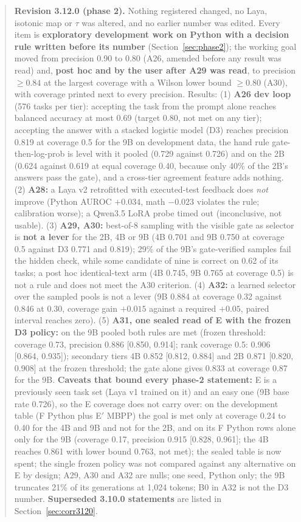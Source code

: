 \documentclass[11pt,a4paper]{article}
\begin{document}
\begin{abstract}
\textbf{Revision 3.12.0 (phase 2).} Nothing registered changed, no Laya, isotonic map or $\tau$ was altered, and no earlier number was edited. Every item is \textbf{exploratory development work on Python with a decision rule written before its number} (Section~\ref{sec:phase2}); the working goal moved from precision 0.90 to 0.80 (A26, amended before any result was read) and, \textbf{post hoc and by the user after A29 was read}, to precision $\ge0.84$ at the largest coverage with a Wilson lower bound $\ge0.80$ (A30), with coverage printed next to every precision. Results: (1) \textbf{A26 dev loop} (576 tasks per tier): accepting the task from the prompt alone reaches balanced accuracy at most 0.69 (target 0.80, not met on any tier); accepting the answer with a stacked logistic model (D3) reaches precision 0.819 at coverage 0.5 for the 9B on development data, the hand rule gate-then-log-prob is level with it pooled (0.729 against 0.726) and on the 2B (0.624 against 0.619 at equal coverage 0.40, because only 40\% of the 2B's answers pass the gate), and a cross-tier agreement feature adds nothing. (2) \textbf{A28:} a Laya v2 retrofitted with executed-test feedback does \emph{not} improve (Python AUROC $+0.034$, math $-0.023$ violates the rule; calibration worse); a Qwen3.5 LoRA probe timed out (inconclusive, not usable). (3) \textbf{A29, A30:} best-of-8 sampling with the visible gate as selector is \textbf{not a lever} for the 2B, 4B or 9B (4B 0.701 and 9B 0.750 at coverage 0.5 against D3 0.771 and 0.819); 29\% of the 9B's gate-verified samples fail the hidden check, while some candidate of nine is correct on 0.62 of its tasks; a post hoc identical-text arm (4B 0.745, 9B 0.765 at coverage 0.5) is not a rule and does not meet the A30 criterion. (4) \textbf{A32:} a learned selector over the sampled pools is not a lever (9B 0.884 at coverage 0.32 against 0.846 at 0.30, coverage gain $+0.015$ against a required $+0.05$, paired interval reaches zero). (5) \textbf{A31, one sealed read of E with the frozen D3 policy:} on the 9B pooled both rules are met (frozen threshold: coverage 0.73, precision 0.886 [0.850, 0.914]; rank coverage 0.5: 0.906 [0.864, 0.935]); secondary tiers 4B 0.852 [0.812, 0.884] and 2B 0.871 [0.820, 0.908] at the frozen threshold; the gate alone gives 0.833 at coverage 0.87 for the 9B. \textbf{Caveats that bound every phase-2 statement:} E is a previously seen task set (Laya v1 trained on it) and an easy one (9B base rate 0.726), so the E coverage does not carry over: on the development table (F Python plus E$'$ MBPP) the goal is met only at coverage 0.24 to 0.40 for the 4B and 9B and not for the 2B, and on its F Python rows alone only for the 9B (coverage 0.17, precision 0.915 [0.828, 0.961]; the 4B reaches 0.861 with lower bound 0.763, not met); the sealed table is now spent; the single frozen policy was not compared against any alternative on E by design; A29, A30 and A32 are nulls; one seed, Python only; the 9B truncates 21\% of its generations at 1,024 tokens; B0 in A32 is not the D3 number. \textbf{Superseded 3.10.0 statements} are listed in Section~\ref{sec:corr3120}.


\end{abstract}
\end{document}
